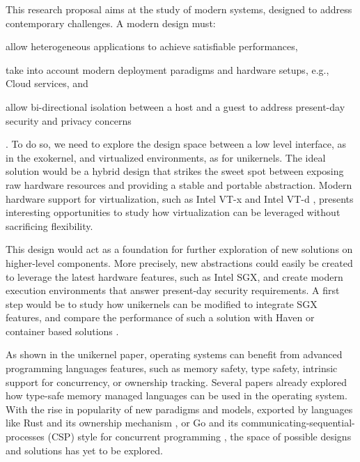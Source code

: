 This research proposal aims at the study of modern systems, designed to address contemporary challenges.
A modern design must:
\begin{enumerate*}
	\item allow heterogeneous applications to achieve satisfiable performances,
	\item take into account modern deployment paradigms and hardware setups, e.g., Cloud services, and 
	\item allow bi-directional isolation between a host and a guest to address present-day security and privacy concerns
\end{enumerate*}.
To do so, we need to explore the design space between a low level interface, as in the exokernel, and virtualized environments, as for unikernels.
The ideal solution would be a hybrid design that strikes the sweet spot between exposing raw hardware resources and providing a stable and portable abstraction.
Modern hardware support for virtualization, such as Intel VT-x \cite{DBLP:journals/computer/UhligNRSMABKLS05} and Intel VT-d \cite{intelVTD}, presents interesting opportunities to study how virtualization can be leveraged without sacrificing flexibility.

This design would act as a foundation for further exploration of new solutions on higher-level components. 
More precisely, new abstractions could easily be created to leverage the latest hardware features, such as Intel SGX, and create modern execution environments that answer present-day security requirements.
A first step would be to study how unikernels can be modified to integrate SGX features, and compare the performance of such a solution with Haven or container based solutions \cite{DBLP:conf/osdi/ArnautovTGKMPLM16}.

As shown in the unikernel paper, operating systems can benefit from advanced programming languages features, such as memory safety, type safety, intrinsic support for concurrency, or ownership tracking.
Several papers \cite{DBLP:conf/asplos/MadhavapeddyMRSSGSHC13,DBLP:conf/sosp/BershadSPSFBCE95,DBLP:journals/sigops/HuntL07} already explored how type-safe memory managed languages can be used in the operating system.
With the rise in popularity of new paradigms and models, exported by languages like Rust and its ownership mechanism \cite{rust}, or Go and its communicating-sequential-processes (CSP) style for concurrent programming \cite{golang}, the space of possible designs and solutions has yet to be explored.